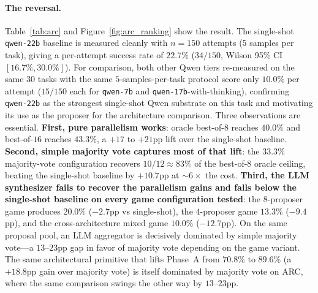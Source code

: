 \documentclass[11pt]{amsart}
\newcommand\1{{\mathds{1}}}
\theoremstyle{definition}
\theoremstyle{remark}
\numberwithin{equation}{section}
\begin{document}
\paragraph{The reversal.}
Table~\ref{tab:arc} and Figure~\ref{fig:arc_ranking} show the result.
The single-shot \texttt{qwen-22b} baseline is measured cleanly with $n\!=\!150$ attempts ($5$ samples per task), giving a per-attempt success rate of $22.7\%$ ($34/150$, Wilson 95\% CI $[16.7\%,30.0\%]$).
For comparison, both other Qwen tiers re-measured on the same $30$ tasks with the same $5$-samples-per-task protocol score only $10.0\%$ per attempt ($15/150$ each for \texttt{qwen-7b} and \texttt{qwen-17b}-with-thinking), confirming \texttt{qwen-22b} as the strongest single-shot Qwen substrate on this task and motivating its use as the proposer for the architecture comparison.
Three observations are essential.
\textbf{First, pure parallelism works}: oracle best-of-$8$ reaches $40.0\%$ and best-of-$16$ reaches $43.3\%$, a $+17$ to $+21$pp lift over the single-shot baseline.
\textbf{Second, simple majority vote captures most of that lift}: the $33.3\%$ majority-vote configuration recovers $10/12 \approx 83\%$ of the best-of-$8$ oracle ceiling, beating the single-shot baseline by $+10.7$pp at $\sim\!6\times$ the cost.
\textbf{Third, the LLM synthesizer fails to recover the parallelism gains and falls below the single-shot baseline on every game configuration tested}: the $8$-proposer game produces $20.0\%$ ($-2.7$pp vs single-shot), the $4$-proposer game $13.3\%$ ($-9.4$pp), and the cross-architecture mixed game $10.0\%$ ($-12.7$pp).
On the same proposal pool, an LLM aggregator is decisively dominated by simple majority vote---a $13$--$23$pp gap in favor of majority vote depending on the game variant.
The same architectural primitive that lifts Phase~A from $70.8\%$ to $89.6\%$ (a $+18.8$pp gain over majority vote) is itself dominated by majority vote on ARC, where the same comparison swings the other way by $13$--$23$pp.
\end{document}
